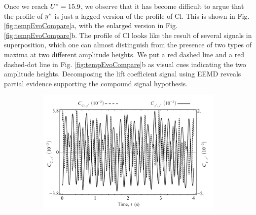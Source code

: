 \documentclass[oneside]{utmthesis}
\begin{document}
Once we reach $U^{*} = 15.9$, we observe that it has become difficult to argue that the profile of $y^{*}$ is just a lagged version of the profile of Cl. This is shown in Fig. \ref{fig:tempEvoCompare}a, with the enlarged version in Fig. \ref{fig:tempEvoCompare}b. The profile of Cl looks like the result of several signals in superposition, which one can almost distinguish from the presence of two types of maxima at two different amplitude heights. We put a red dashed line and a red dashed-dot line in Fig. \ref{fig:tempEvoCompare}b as visual cues indicating the two amplitude heights. Decomposing the lift coefficient signal using EEMD reveals partial evidence supporting the compound signal hypothesis.

\begin{figure}
  \centering
  \begin{subfigure}[h]{1\textwidth}
    \includegraphics[width=\textwidth]{figs/tempEvoCompare-a}
    \caption{}
    \label{fig:tempEvoCompare-a}
  \end{subfigure}


\end{figure}
\end{document}
